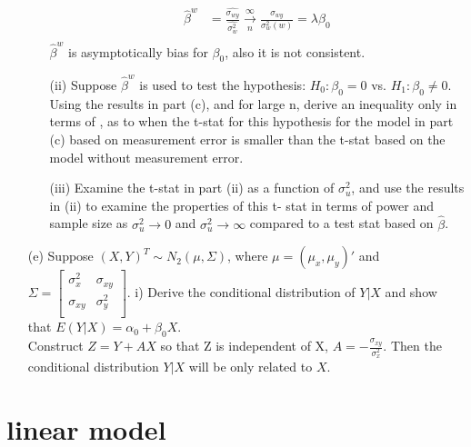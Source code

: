 \begin{itemize}
\begin{itemize}
\begin{align*}
    \hat{\beta}^w &= \frac{\hat{\sigma_{wy}}}{\hat{\sigma_w^2}} \xrightarrow[n]{ \infty} \frac{\sigma_{wy}}{\sigma_w^2(w)} = \lambda \beta_0\\
    \end{align*}      
    $\hat{\beta}^w$ is asymptotically bias for $\beta_0$, also it is not consistent.\\
    \item[(ii)] Suppose $\hat{\beta}^w$ is used to test the hypothesis: $H_0: \beta_0=0$ vs. $H_1: \beta_0 \neq 0$. Using the results in part (c), and for large n, derive an inequality only in terms of , as to when the t-stat for this hypothesis for the model in part (c) based on measurement error is smaller than the t-stat based on the model without measurement error.\\
    
    \item[(iii)] Examine the t-stat in part (ii) as a function of $\sigma_u^2$, and use the results in (ii) to examine the properties of this t- stat in terms of power and sample size as $\sigma_u^2 \rightarrow 0$ and $\sigma_u^2 \rightarrow \infty$ compared to a test stat based on $\hat{\beta}$.
    \end{itemize}
    \item[(e)] Suppose $(X,Y)^T \sim N_2(\mu, \Sigma)$, where $\mu= (\mu_x, \mu_y)'$ and $\Sigma = \begin{bmatrix}
           \sigma_x^2  &  \sigma_{xy}  \\
            \sigma_{xy} &   \sigma_{y}^2\\
         \end{bmatrix}$. i) Derive the conditional distribution of $Y|X$ and show that $E(Y|X) = \alpha_0 + \beta_0 X$. \\
         Construct $Z= Y+ AX$ so that Z is independent of X, $A= -\frac{\sigma_{xy}}{\sigma_x^2}$. Then the conditional distribution $Y|X$ will be only related to $X$.
    \end{itemize}
    

\section{linear model} 

